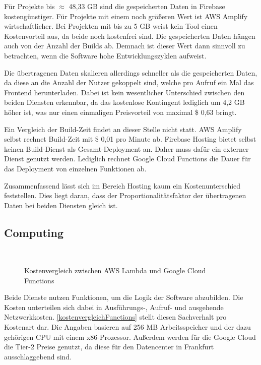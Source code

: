 Für Projekte bis $\approx$ 48,33 GB sind die gespeicherten Daten in Firebase kostengünstiger. Für Projekte mit einem noch größeren Wert ist \ac{AWS} Amplify wirtschaftlicher. Bei Projekten mit bis zu 5 GB weist kein Tool einen Kostenvorteil aus, da beide noch kostenfrei sind. Die gespeicherten Daten hängen auch von der Anzahl der Builds ab. Demnach ist dieser Wert dann sinnvoll zu betrachten, wenn die Software hohe Entwicklungszyklen aufweist.

Die übertragenen Daten skalieren allerdings schneller als die gespeicherten Daten, da diese an die Anzahl der Nutzer gekoppelt sind, welche pro Aufruf ein Mal das Frontend herunterladen. Dabei ist kein wesentlicher Unterschied zwischen den beiden Diensten erkennbar, da das kostenlose Kontingent lediglich um 4,2 GB höher ist, was nur einen einmaligen Preisvorteil von maximal \$ 0,63 bringt.

Ein Vergleich der Build-Zeit findet an dieser Stelle nicht statt. \ac{AWS} Amplify selbst rechnet Build-Zeit mit \$ 0,01 pro Minute ab. Firebase Hosting bietet selbst keinen Build-Dienst als Gesamt-Deployment an. Daher muss dafür ein externer Dienst genutzt werden. Lediglich rechnet Google Cloud Functions die Dauer für das Deployment von einzelnen Funktionen ab.

Zusammenfassend lässt sich im Bereich Hosting kaum ein Kostenunterschied feststellen. Dies liegt daran, dass der  Proportionalitätsfaktor der übertragenen Daten bei beiden Diensten gleich ist.

\subsection{Computing}

\begin{figure}
  \centering
  \quad
  \\
  \quad
  \caption{Kostenvergleich zwischen AWS Lambda und Google Cloud Functions}
  \label{kostenvergleichFunctions}
\end{figure}

Beide Dienste nutzen Funktionen, um die Logik der Software abzubilden. Die Kosten unterteilen sich dabei in Ausführungs-, Aufruf- und ausgehende Netzwerkkosten. \autoref{kostenvergleichFunctions} stellt diesen Sachverhalt pro Kostenart dar. Die Angaben basieren auf 256 MB Arbeitsspeicher und der dazu gehörigen CPU mit einem x86-Prozessor. Außerdem werden für die Google Cloud die Tier-2 Preise genutzt, da diese für den Datencenter in Frankfurt ausschlaggebend sind.

